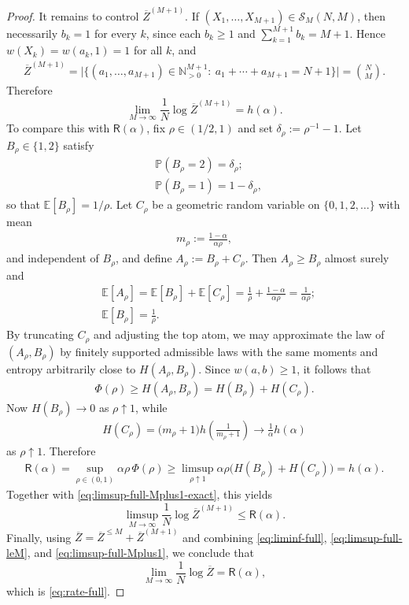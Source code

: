 \documentclass[11pt]{amsart}
\numberwithin{equation}{section}
\numberwithin{equation}{section}
\newcommand{\1}{\mathbbm{1}}
\newcommand{\E}{\mathbb{E}}
\newcommand{\Prob}{\mathbb{P}}
\newcommand{\N}{\mathbb{N}}
\theoremstyle{definition}
\begin{document}
\begin{proof}
It remains to control $\overline{Z}^{(M+1)}$. If $(X_1,\dots,X_{M+1})\in\mathcal S_M(N,M)$, then necessarily $b_k=1$ for every $k$, since each $b_k\ge 1$ and $\sum_{k=1}^{M+1} b_k=M+1$. Hence $w(X_k)=w(a_k,1)=1$ for all $k$, and
\begin{align*}
    \overline{Z}^{(M+1)}
    =\bigl|\{(a_1,\dots,a_{M+1})\in\N_{>0}^{M+1}:\ a_1+\cdots+a_{M+1}=N+1\}\bigr|
    =\binom{N}{M}.
\end{align*}
Therefore
\begin{equation}\label{eq:limsup-full-Mplus1-exact}
    \lim_{M\to\infty}\frac{1}{N}\log \overline{Z}^{(M+1)}=h(\alpha).
\end{equation}
To compare this with $\mathsf R(\alpha)$, fix $\rho\in(1/2,1)$ and set $\delta_\rho:=\rho^{-1}-1$. Let $B_\rho\in\{1,2\}$ satisfy
\begin{align*}
    & \Prob(B_\rho=2)=\delta_\rho; \\
    & \Prob(B_\rho=1)=1-\delta_\rho,
\end{align*}
so that $\E[B_\rho]=1/\rho$. Let $C_\rho$ be a geometric random variable on $\{0,1,2,\dots\}$ with mean
\begin{align*}
    m_\rho:=\frac{1-\alpha}{\alpha\rho},
\end{align*}
and independent of $B_\rho$, and define $A_\rho:=B_\rho+C_\rho$. Then $A_\rho\ge B_\rho$ almost surely and
\begin{align*}
    & \E[A_\rho]=\E[B_\rho]+\E[C_\rho]=\frac{1}{\rho}+\frac{1-\alpha}{\alpha\rho}=\frac{1}{\alpha\rho}; \\
    & \E[B_\rho]=\frac{1}{\rho}.
\end{align*}
By truncating $C_\rho$ and adjusting the top atom, we may approximate the law of $(A_\rho,B_\rho)$ by finitely supported admissible laws with the same moments and entropy arbitrarily close to $H(A_\rho,B_\rho)$. Since $w(a,b)\ge 1$, it follows that
\begin{align*}
    \Phi(\rho)\ge H(A_\rho,B_\rho)=H(B_\rho)+H(C_\rho).
\end{align*}
Now $H(B_\rho)\to 0$ as $\rho\uparrow 1$, while
\begin{align*}
    H(C_\rho)=\bigl(m_\rho+1\bigr)h\!\left(\frac{1}{m_\rho+1}\right) \longrightarrow \frac{1}{\alpha}h(\alpha)
\end{align*}
as $\rho\uparrow 1$. Therefore
\begin{align*}
    \mathsf R(\alpha)=\sup_{\rho\in(0,1)}\alpha\rho\,\Phi(\rho)
    \ge \limsup_{\rho\uparrow 1} \alpha\rho\bigl(H(B_\rho)+H(C_\rho)\bigr)
    =h(\alpha).
\end{align*}
Together with \eqref{eq:limsup-full-Mplus1-exact}, this yields
\begin{equation}\label{eq:limsup-full-Mplus1}
    \limsup_{M\to\infty}\frac{1}{N}\log \overline{Z}^{(M+1)}\le \mathsf R(\alpha).
\end{equation}
Finally, using $\overline{Z}=\overline{Z}^{\le M}+\overline{Z}^{(M+1)}$ and combining \eqref{eq:liminf-full}, \eqref{eq:limsup-full-leM}, and \eqref{eq:limsup-full-Mplus1}, we conclude that
\[
\lim_{M\to\infty}\frac{1}{N}\log\overline{Z}= \mathsf R(\alpha),
\]
which is \eqref{eq:rate-full}.
\end{proof}
\end{document}
